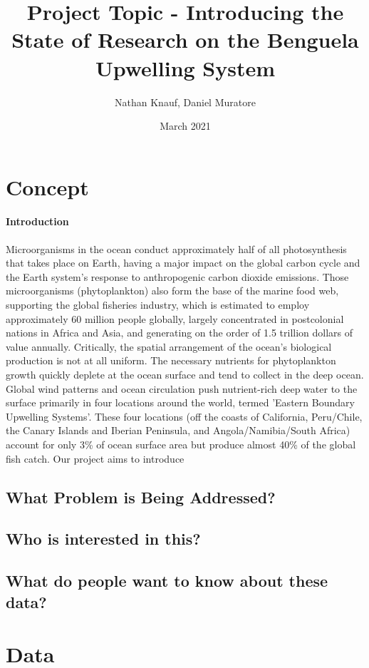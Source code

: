 \documentclass{article}
\title{Project Topic - Introducing the State of Research on the Benguela Upwelling System}
\author{Nathan Knauf, Daniel Muratore}
\date{March 2021}
\begin{document}
\maketitle

\section{Concept}
\paragraph{Introduction} Microorganisms in the ocean conduct approximately half of all photosynthesis that takes place on Earth, having a major impact on the global carbon cycle and the Earth system's response to anthropogenic carbon dioxide emissions. Those microorganisms (phytoplankton) also form the base of the marine food web, supporting the global fisheries industry, which is estimated to employ approximately 60 million people globally, largely concentrated in postcolonial nations in Africa and Asia, and generating on the order of 1.5 trillion dollars of value annually. Critically, the spatial arrangement of the ocean's biological production is not at all uniform. The necessary nutrients for phytoplankton growth quickly deplete at the ocean surface and tend to collect in the deep ocean. Global wind patterns and ocean circulation push nutrient-rich deep water to the surface primarily in four locations around the world, termed 'Eastern Boundary Upwelling Systems'. These four locations (off the coasts of California, Peru/Chile, the Canary Islands and Iberian Peninsula, and Angola/Namibia/South Africa) account for only 3\% of ocean surface area but produce almost 40\% of the global fish catch. Our project aims to introduce 
\subsection{What Problem is Being Addressed?}
\subsection{Who is interested in this?}
\subsection{What do people want to know about these data?}
\section{Data}
\paragraph{}
\end{document}
